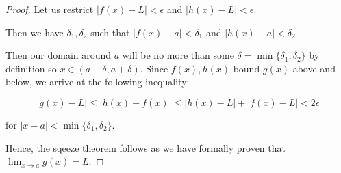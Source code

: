 \documentclass[12pt]{article}
\theoremstyle{remark}
\begin{document}
\begin{proof}
 Let us restrict $|f(x) - L| < \epsilon$ and $|h(x) - L| < \epsilon$. 
 
 Then we have $\delta_1,\delta_2$ such that $|f(x)-a| < \delta_1$ and $|h(x) - a| < \delta_2$
 
 
 Then our domain around $a$ will be no more than some $\delta = \min\{\delta_1,\delta_2\}$ by definition so $x \in (a-\delta, a+ \delta)$. Since $f(x),h(x)$ bound $g(x)$ above and below, we arrive at the following inequality:

 $$|g(x) - L| \leq |h(x) - f(x)| \leq |h(x) - L| + |f(x) - L| < 2\epsilon$$
 
 for $|x-a| < \min\{\delta_1,\delta_2\}$.

 Hence, the sqeeze theorem follows as we have formally proven that $\lim_{x \rightarrow a} g(x) = L$.
 
 \end{proof}
 
 
\end{document}
